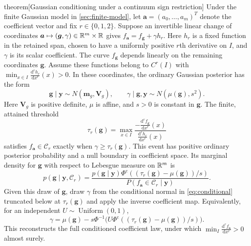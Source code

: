 \begin{theoremEnd}[combined main,category=finite]{theorem}[Gaussian conditioning under a continuum sign restriction]
\label{thm:finite}
Under the finite Gaussian model in \cref{sec:finite-model}, let
$\boldsymbol a=(a_0,\ldots,a_m)^T$ denote the coefficient vector and fix
$r\in\{0,1,2\}$. Suppose an invertible linear change of coordinates
$\boldsymbol a\mapsto(\boldsymbol g,\gamma)\in\mathbb R^m\times\mathbb R$
gives $f_{\boldsymbol a}=f_{\boldsymbol g}+\gamma h_r$.
Here $h_r$ is a fixed function in the retained span, chosen to have a
uniformly positive $r$th derivative on $I$, and $\gamma$ is its scalar
coefficient. The curve $f_{\boldsymbol g}$ depends linearly on the
remaining coordinates $\boldsymbol g$. Assume these functions belong
to $C^r(I)$ with
$\min_{x\in I}\frac{\mathrm{d}^rh_r}{\mathrm{d}x^r}(x)>0$.
In these coordinates, the ordinary Gaussian posterior has the form
\begin{equation}\label{eq:conditional}
 \boldsymbol g\mid\boldsymbol y\sim N(\boldsymbol m_g,\boldsymbol V_g),
 \qquad \gamma\mid\boldsymbol g,\boldsymbol y\sim N(\mu(\boldsymbol g),s^2).
\end{equation}
Here $\boldsymbol V_g$ is positive definite, $\mu$ is affine, and
$s>0$ is constant in $\boldsymbol g$. The finite, attained threshold
\begin{equation}\label{eq:threshold}
 \tau_r(\boldsymbol g)=\max_{x\in I}
 \frac{-\frac{\mathrm{d}^rf_{\boldsymbol g}}{\mathrm{d}x^r}(x)}
      {\frac{\mathrm{d}^rh_r}{\mathrm{d}x^r}(x)}
\end{equation}
satisfies $f_{\boldsymbol a}\in\mathcal C_r$ exactly when
$\gamma\geq\tau_r(\boldsymbol g)$. This event has positive ordinary
posterior probability and a null boundary in coefficient space.
Its marginal density for $\boldsymbol g$ with
respect to Lebesgue measure on $\mathbb R^m$ is
\begin{equation}\label{eq:marginal}
 p(\boldsymbol g\mid\boldsymbol y,\mathcal C_r)=
 \frac{p(\boldsymbol g\mid\boldsymbol y)
 \Phi^{\mathrm c}((\tau_r(\boldsymbol g)-\mu(\boldsymbol g))/s)}
 {P(f_{\boldsymbol a}\in\mathcal C_r\mid\boldsymbol y)}.
\end{equation}
Given this draw of $\boldsymbol g$, draw $\gamma$ from the conditional normal in
\cref{eq:conditional} truncated below at $\tau_r(\boldsymbol g)$ and
apply the inverse coefficient map. Equivalently, for an independent
$U\sim\operatorname{Uniform}(0,1)$,
\begin{equation}\label{eq:reconstruction}
 \gamma=\mu(\boldsymbol g)-s\Phi^{-1}
 \bigl(U\Phi^{\mathrm c}((\tau_r(\boldsymbol g)-\mu(\boldsymbol g))/s)\bigr).
\end{equation}
This reconstructs the full conditioned coefficient law, under which
$\min_I\frac{\mathrm{d}^rf_{\boldsymbol a}}{\mathrm{d}x^r}>0$ almost surely.
\end{theoremEnd}

